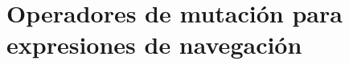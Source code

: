 \documentclass[11pt,a4paper]{report} %
\begin{document}
\frenchspacing
\raggedbottom

\pagestyle{plain}
%


\cleardoublepage\null

\cleardoublepage%
%
\pagestyle{scrheadings}
\pagestyle{headings}
\cleardoublepage

\cleardoublepage




%

\part{Operadores de mutaci\'on para expresiones de navegaci\'on} 
\cleardoublepage\null


%

%

\cleardoublepage\null
%

%
%
{}

\end{document}
